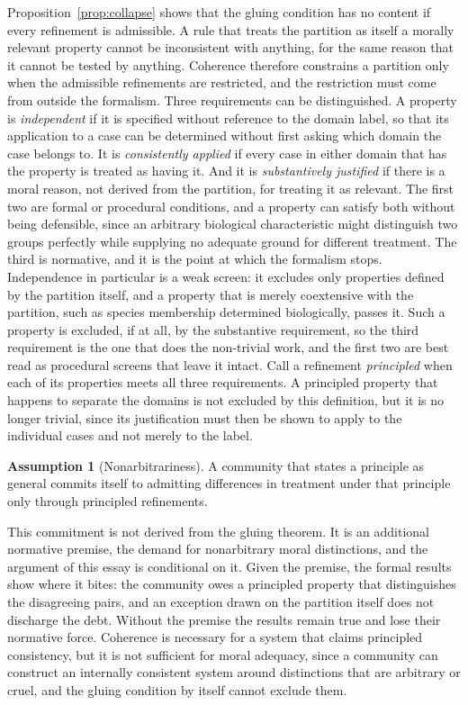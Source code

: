 \documentclass[11pt]{article}
\theoremstyle{definition}
\newtheorem{assumption}[definition]{Assumption}
\theoremstyle{plain}
\theoremstyle{definition}
\begin{document}
Proposition~\ref{prop:collapse} shows that the gluing condition has no content if every refinement is admissible. A rule that treats the partition as itself a morally relevant property cannot be inconsistent with anything, for the same reason that it cannot be tested by anything. Coherence therefore constrains a partition only when the admissible refinements are restricted, and the restriction must come from outside the formalism. Three requirements can be distinguished. A property is \emph{independent} if it is specified without reference to the domain label, so that its application to a case can be determined without first asking which domain the case belongs to. It is \emph{consistently applied} if every case in either domain that has the property is treated as having it. And it is \emph{substantively justified} if there is a moral reason, not derived from the partition, for treating it as relevant. The first two are formal or procedural conditions, and a property can satisfy both without being defensible, since an arbitrary biological characteristic might distinguish two groups perfectly while supplying no adequate ground for different treatment. The third is normative, and it is the point at which the formalism stops. Independence in particular is a weak screen: it excludes only properties defined by the partition itself, and a property that is merely coextensive with the partition, such as species membership determined biologically, passes it. Such a property is excluded, if at all, by the substantive requirement, so the third requirement is the one that does the non-trivial work, and the first two are best read as procedural screens that leave it intact. Call a refinement \emph{principled} when each of its properties meets all three requirements. A principled property that happens to separate the domains is not excluded by this definition, but it is no longer trivial, since its justification must then be shown to apply to the individual cases and not merely to the label.

\begin{assumption}[Nonarbitrariness]
A community that states a principle as general commits itself to admitting differences in treatment under that principle only through principled refinements.
\end{assumption}

This commitment is not derived from the gluing theorem. It is an additional normative premise, the demand for nonarbitrary moral distinctions, and the argument of this essay is conditional on it. Given the premise, the formal results show where it bites: the community owes a principled property that distinguishes the disagreeing pairs, and an exception drawn on the partition itself does not discharge the debt. Without the premise the results remain true and lose their normative force. Coherence is necessary for a system that claims principled consistency, but it is not sufficient for moral adequacy, since a community can construct an internally consistent system around distinctions that are arbitrary or cruel, and the gluing condition by itself cannot exclude them.
\end{document}

